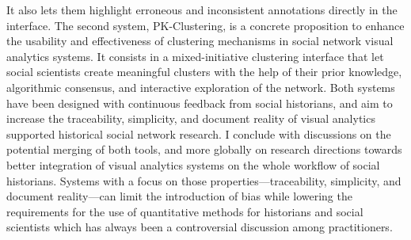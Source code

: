 {{It also lets them highlight erroneous and inconsistent annotations directly in the interface.
The second system, PK-Clustering, is a concrete proposition to enhance the usability and effectiveness of clustering mechanisms in social network visual analytics systems. It consists in a mixed-initiative clustering interface that let social scientists create meaningful clusters with the help of their prior knowledge, algorithmic consensus, and interactive exploration of the network.
Both systems have been designed with continuous feedback from social historians, and aim to increase the traceability, simplicity, and document reality of
visual analytics supported historical social network research.
I conclude with discussions on the potential merging of both tools, and more globally on research directions towards better integration of visual analytics systems on the whole workflow of social historians.
Systems with a focus on those properties---traceability, simplicity, and document reality---can limit the introduction of bias while lowering the requirements for the use of quantitative methods for historians and social scientists which has always been a controversial discussion among practitioners.}}

